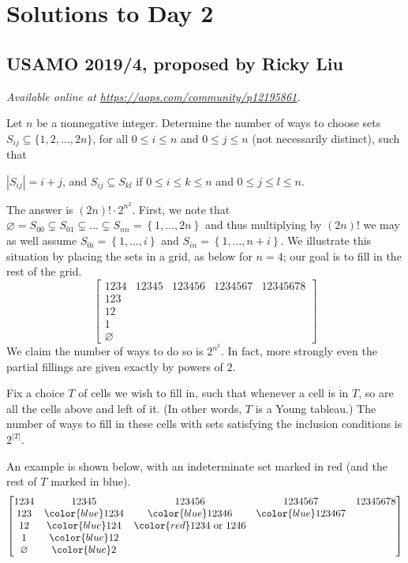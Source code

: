 \documentclass[11pt]{scrartcl}
\begin{document}
\section{Solutions to Day 2}
\subsection{USAMO 2019/4, proposed by Ricky Liu}
\textsl{Available online at \url{https://aops.com/community/p12195861}.}
\begin{mdframed}[style=mdpurplebox,frametitle={Problem statement}]
Let $n$ be a nonnegative integer.
Determine the number of ways to choose sets
$S_{ij} \subseteq \{1, 2, \dots, 2n\}$,
for all $0 \le i \le n$ and $0 \le j \le n$
(not necessarily distinct), such that
\begin{itemize}
  \ii $|S_{ij}| = i+j$, and
  \ii $S_{ij} \subseteq S_{kl}$ if $0 \le i \le k \le n$
  and $0 \le j \le l \le n$.
\end{itemize}
\end{mdframed}
The answer is $(2n)! \cdot 2^{n^2}$.
First, we note that
$\varnothing = S_{00} \subsetneq S_{01} \subsetneq \dots \subsetneq S_{nn}
= \left\{ 1, \dots, 2n \right\}$
and thus multiplying by $(2n)!$
we may as well assume $S_{0i} = \left\{ 1, \dots, i \right\}$
and $S_{in} = \left\{ 1, \dots, n+i \right\}$.
We illustrate this situation by placing the sets in a grid,
as below for $n = 4$;
our goal is to fill in the rest of the grid.
\[
  \begin{bmatrix}
    1234 & 12345 & 123456 & 1234567 & 12345678\\
    123 \\
    12 \\
    1 \\
    \varnothing
  \end{bmatrix}
\]
We claim the number of ways to do so is $2^{n^2}$.
In fact, more strongly even the partial fillings
are given exactly by powers of $2$.
\begin{claim*}
  Fix a choice $T$ of cells we wish to fill in,
  such that whenever a cell is in $T$,
  so are all the cells above and left of it.
  (In other words, $T$ is a Young tableau.)
  The number of ways to fill in these cells with sets
  satisfying the inclusion conditions is $2^{|T|}$.
\end{claim*}
An example is shown below, with an indeterminate set marked in red
(and the rest of $T$ marked in blue).
\[
  \begin{bmatrix}
    1234 & 12345 & 123456 & 1234567 & 12345678\\
    123 & {\color{blue}1234} & {\color{blue}12346} & {\color{blue}123467} \\
    12 & {\color{blue}124} & {\color{red}1234 \text{ or } 1246} \\
    1 & {\color{blue}12} \\
    \varnothing & {\color{blue}2}
  \end{bmatrix}
\]
\end{document}
